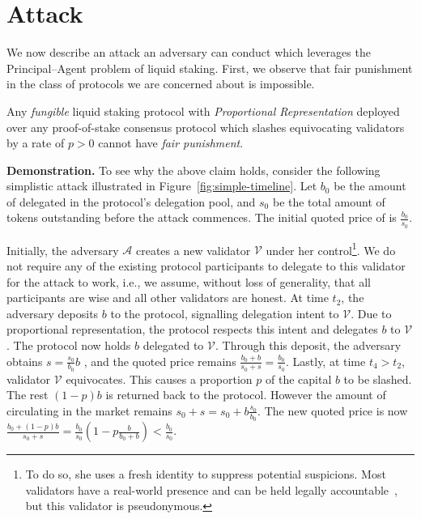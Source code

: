 \section{Attack}\label{sec:attack}
We now describe an attack an adversary can conduct which leverages the
Principal--Agent problem of liquid staking. First, we observe that
fair punishment in the class of protocols we are concerned
about is impossible.

\begin{claim}
Any \emph{fungible} liquid staking protocol with \emph{Proportional Representation}
deployed over any proof-of-stake consensus protocol which slashes equivocating validators by a rate of $p > 0$
cannot have \emph{fair punishment}.
\end{claim}

\noindent
\textbf{Demonstration.}
To see why the above claim holds, consider the following simplistic attack
illustrated in Figure~\ref{fig:simple-timeline}.
Let $b_0$ be the amount of delegated \asset in the protocol's delegation pool,
and $s_0$ be the total amount of \stasset tokens outstanding
before the attack commences. The initial quoted price of \stasset
is $\frac{b_0}{s_0}$.

Initially, the adversary $\mathcal{A}$ creates
a new validator $\mathcal{V}$ under her
control\footnote{To do so, she uses a fresh identity
to suppress potential suspicions. Most validators
have a real-world presence and can be held legally
accountable~\cite[p.~29]{liquid-staking-report}, but this validator is pseudonymous.}.
We do not require any of the existing protocol participants to delegate
to this validator for the attack to work, i.e., we assume, without loss of
generality, that all participants
are wise and all other validators are honest.
At time $t_2$, the adversary deposits $b$ \asset to the protocol,
signalling delegation intent to $\mathcal{V}$.
Due to proportional representation,
the protocol respects this intent and delegates $b$ \asset to $\mathcal{V}$.
The protocol now holds $b$ delegated \asset to $\mathcal{V}$.
Through this deposit, the adversary obtains
$s = \frac{s_0}{b_0} b$ \stasset, and the quoted price remains
$\frac{b_0 + b}{s_0 + s} = \frac{b_0}{s_0}$.
Lastly, at time $t_4 > t_2$, validator
$\mathcal{V}$ equivocates. This causes a proportion $p$ of
the capital $b$ to be slashed.
The rest $(1 - p)b$ \asset is returned back to the protocol.
However the amount of \stasset circulating in the
market remains $s_0 + s = s_0 + b\frac{s_0}{b_0}$.
The new quoted price is now
$\frac{b_0 + (1 - p)b}{s_0 + s} = \frac{b_0}{s_0}(1 - p\frac{b}{b_0 + b}) < \frac{b_0}{s_0}$.

